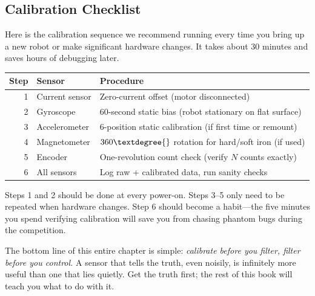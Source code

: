 \vspace{0.5em}
\subsection{Calibration Checklist}

Here is the calibration sequence we recommend running every time you bring up a new robot or make significant hardware changes. It takes about 30 minutes and saves hours of debugging later.

\begin{center}
\begin{tabular}{rll}
\toprule
\textbf{Step} & \textbf{Sensor} & \textbf{Procedure} \\
\midrule
1 & Current sensor & Zero-current offset (motor disconnected) \\
2 & Gyroscope & 60-second static bias (robot stationary on flat surface) \\
3 & Accelerometer & 6-position static calibration (if first time or remount) \\
4 & Magnetometer & $360\textdegree{}$ rotation for hard/soft iron (if used) \\
5 & Encoder & One-revolution count check (verify $N$ counts exactly) \\
6 & All sensors & Log raw + calibrated data, run sanity checks \\
\bottomrule
\end{tabular}
\end{center}

Steps 1 and 2 should be done at every power-on. Steps 3--5 only need to be repeated when hardware changes. Step 6 should become a habit---the five minutes you spend verifying calibration will save you from chasing phantom bugs during the competition.

The bottom line of this entire chapter is simple: \textit{calibrate before you filter, filter before you control.} A sensor that tells the truth, even noisily, is infinitely more useful than one that lies quietly. Get the truth first; the rest of this book will teach you what to do with it.
